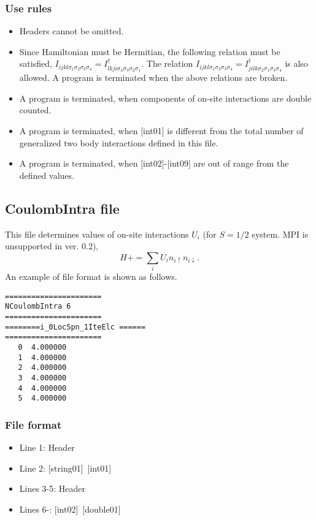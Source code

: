 \subsubsection{Use rules}
\begin{itemize}
\item Headers cannot be omitted. 
\item Since Hamiltonian must be Hermitian, the following relation must be satisfied, $I_{ijkl\sigma_1\sigma_2\sigma_3\sigma_4}=I_{lkji\sigma_4\sigma_3\sigma_2\sigma_1}^{\dag}$. The relation  $I_{ijkl\sigma_1\sigma_2\sigma_3\sigma_4}=I_{jilk\sigma_2\sigma_1\sigma_3\sigma_4}^{\dag}$ is also allowed. A program is terminated when the above relations are broken.
\item A program is terminated, when components of on-site interactions are double counted.
\item A program is terminated, when $[$int01$]$ is different from the total number of generalized two body interactions defined in this file.
\item A program is terminated, when $[$int02$]$-$[$int09$]$ are out of range from the defined values.
\end{itemize}


\newpage
\subsection{CoulombIntra file}
This file determines values of on-site interactions $U_i$ {(for $S=1/2$ system. MPI is unsupported in ver. 0.2)},
\begin{equation}
H+=\sum_{i}U_i n_ {i \uparrow}n_{i \downarrow}.
\end{equation}
An example of file format is shown as follows.

\begin{minipage}{12.5cm}
\begin{screen}
\begin{verbatim}
====================== 
NCoulombIntra 6  
====================== 
========i_0LocSpn_1IteElc ====== 
====================== 
   0  4.000000
   1  4.000000
   2  4.000000
   3  4.000000
   4  4.000000
   5  4.000000
\end{verbatim}
\end{screen}
\end{minipage}

\subsubsection{File format}
 \begin{itemize}
   \item  Line 1:  Header
   \item  Line 2:   [string01]~[int01]
   \item  Lines 3-5:  Header
   \item  Lines 6-:  [int02]~[double01] 
  \end{itemize}
